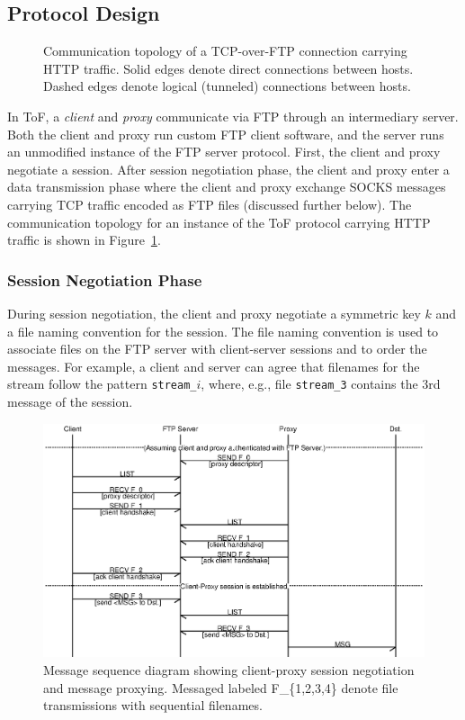 \documentclass[letterpaper,twocolumn,11pt]{article}
\begin{document}
\subsection{Protocol Design} \label{subsec:design}

\begin{figure}[t]
  \centering
  
  \caption{Communication topology of a TCP-over-FTP connection carrying HTTP
  traffic. Solid edges denote direct connections between hosts. Dashed
edges denote logical (tunneled) connections between hosts.}
  \label{fig:topology}
\end{figure}

In ToF, a \emph{client} and \emph{proxy} communicate via FTP through an
intermediary server. Both the client and proxy run custom FTP client software,
and the server runs an unmodified instance of the FTP server protocol.
First,
the client and proxy negotiate a session. After session negotiation phase, the
client and proxy enter a data transmission phase where the client and proxy
exchange SOCKS messages carrying TCP traffic encoded as FTP files
(discussed further below). The communication topology for an instance of the
ToF protocol carrying HTTP traffic is shown in Figure~\ref{fig:topology}.

\subsubsection{Session Negotiation Phase} \label{subsubsec:session}

During session negotiation, the client and proxy negotiate a symmetric key $k$
and a file naming convention for the session. The file naming convention is
used to associate files on the FTP server with client-server sessions and to
order the messages.  For example, a client and server can agree that filenames
for the stream follow the pattern \texttt{stream\_$i$}, where, e.g., file
\texttt{stream\_3} contains the 3rd message of the session.

\begin{figure}[t]
  \centering
  \includegraphics[width=\textwidth]{tof_seq}
  \caption{Message sequence diagram showing client-proxy session negotiation
    and message proxying. Messaged labeled F\_\{1,2,3,4\} denote
  file transmissions with sequential filenames.}
  \label{fig:msgseq}
\end{figure}
\end{document}
